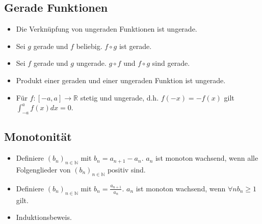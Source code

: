 \documentclass[a4paper,10pt]{article}
\begin{document}
\subsection{Gerade Funktionen}
\begin{itemize}
  \item Die Verknüpfung von ungeraden Funktionen ist ungerade. 
  \item Sei $g$ gerade und $f$ beliebig. $f \circ g$ ist gerade.
  \item Sei $f$ gerade und $g$ ungerade. $g \circ f$ und $f \circ g$ sind gerade.
  \item Produkt einer geraden und einer ungeraden Funktion ist ungerade.
  \item Für $f: [-a, a] \to \mathbb{R}$ stetig und ungerade, d.h. $f(-x) = -f(x)$ gilt $\int_{-a}^a f(x) dx = 0$.
\end{itemize}

\subsection{Monotonität}

\begin{itemize}
  \item Definiere $(b_n)_{n \in \mathbb{N}}$ mit $b_n = a_{n+1} - a_n$. $a_n$ ist monoton wachsend, wenn alle Folgenglieder von $(b_n)_{n \in \mathbb{N}}$ positiv sind.
  \item Definiere $(b_n)_{n \in \mathbb{N}}$ mit $b_n = \frac{a_{n+1}}{a_n}$. $a_n$ ist monoton wachsend, wenn $\forall n b_n \geq 1$ gilt.
  \item Induktionsbeweis.
\end{itemize}
\end{document}
